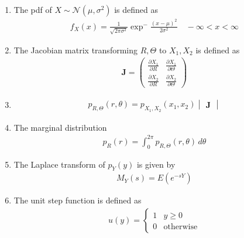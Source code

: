 \documentclass[journal,12pt,onecolumn]{IEEEtran}
\renewcommand\thesection{\arabic{section}}
\renewcommand\thesubsection{\thesection.\arabic{subsection}}
\providecommand{\brak}[1]{\ensuremath{\left(#1\right)}}
\theoremstyle{remark}
\newcommand{\myvec}[1]{\ensuremath{\begin{pmatrix}#1\end{pmatrix}}}
\newcommand{\mydet}[1]{\ensuremath{\begin{vmatrix}#1\end{vmatrix}}}
\numberwithin{equation}{section}
\let\vec\mathbf
\begin{document}
\begin{enumerate}[label=\arabic*.,ref=\thesubsection.\theenumi]
	\item  The pdf of $X \sim \mathcal{N}\brak{\mu,\sigma^2}$ is defined as
\begin{align}
	f_X\brak{x} = \frac{1}{\sqrt{2 \pi \sigma^2}} \exp ^-{\frac{(x- \mu)^2}{2\sigma^2}} \quad -\infty < x < \infty
\end{align}
\item The Jacobian matrix transforming $R, \Theta$ to $X_1,X_2$  is defined as 
\begin{align}
	\vec{J} = \myvec{
		\frac{\partial X_1}{\partial R}
		& \frac{\partial X_1}{\partial \Theta} \\
		\frac{\partial X_2}{\partial R}
		&\frac{\partial X_2}{\partial \Theta}
		}
\end{align}
\item 
\begin{align}
		p_{R, \Theta} \brak{r, \theta} 
 = 
	p_{X_1,X_2}\brak{x_1,x_2} \mydet{\vec{J}}
\end{align}
\item The marginal distribution 
\begin{align}
	p_R(r) = \int_{0}^{2\pi}
		p_{R, \Theta} \brak{r, \theta} \, d\theta
\end{align}
\item The Laplace transform of $p_Y(y)$ is given by 
\begin{align}
	M_{Y}(s) = E\brak{e^{-sY}}
\end{align}
\item The unit step function is defined as 
\begin{align}
	u(y) = 
	\begin{cases}
		1 & y \ge 0
		\\
		0 & \text{otherwise}
	\end{cases}
\end{align}

\end{enumerate}
\end{document}
